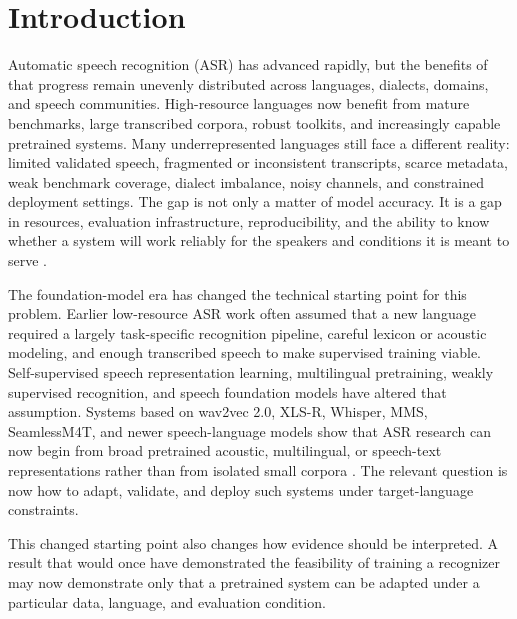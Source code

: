 \documentclass[pdflatex,sn-basic]{sn-jnl}
\theoremstyle{thmstyleone}
\theoremstyle{thmstyletwo}
\theoremstyle{thmstylethree}
\begin{document}

\maketitle

\section{Introduction}

Automatic speech recognition (ASR) has advanced rapidly, but the benefits of that progress remain unevenly distributed across languages, dialects, domains, and speech communities. High-resource languages now benefit from mature benchmarks, large transcribed corpora, robust toolkits, and increasingly capable pretrained systems. Many underrepresented languages still face a different reality: limited validated speech, fragmented or inconsistent transcripts, scarce metadata, weak benchmark coverage, dialect imbalance, noisy channels, and constrained deployment settings. The gap is not only a matter of model accuracy. It is a gap in resources, evaluation infrastructure, reproducibility, and the ability to know whether a system will work reliably for the speakers and conditions it is meant to serve \citep{besacier2014_underresourced_asr_survey,ardila2020commonvoice,conneau2022fleurs,shi2023mlsuperb}.

The foundation-model era has changed the technical starting point for this problem. Earlier low-resource ASR work often assumed that a new language required a largely task-specific recognition pipeline, careful lexicon or acoustic modeling, and enough transcribed speech to make supervised training viable. Self-supervised speech representation learning, multilingual pretraining, weakly supervised recognition, and speech foundation models have altered that assumption. Systems based on wav2vec 2.0, XLS-R, Whisper, MMS, SeamlessM4T, and newer speech-language models show that ASR research can now begin from broad pretrained acoustic, multilingual, or speech-text representations rather than from isolated small corpora \citep{baevski2020wav2vec2,babu22_interspeech,pmlr-v202-radford23a,pratap2024mms,seamless2025_joint_speech_text_mt,tian25b_interspeech}. The relevant question is now how to adapt, validate, and deploy such systems under target-language constraints.

This changed starting point also changes how evidence should be interpreted. A result that would once have demonstrated the feasibility of training a recognizer may now demonstrate only that a pretrained system can be adapted under a particular data, language, and evaluation condition.
\end{document}
